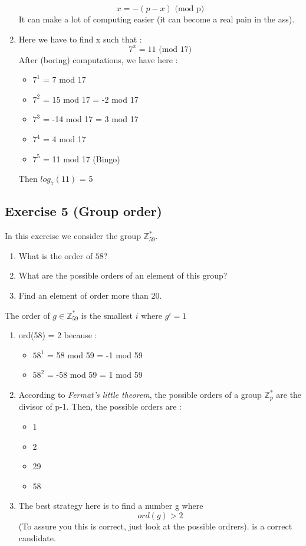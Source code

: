 \begin{solution}
\begin{enumerate}
    $$ x = -(p - x) \text{ (mod p)} $$  
    It can make a lot of computing easier (it can become a real pain in the ass).
    \item Here we have to find x such that : 
    $$ 7^x = 11 \text{ (mod 17)} $$
    After (boring) computations, we have here :
    \begin{itemize}
        \item $7^1$ = 7 mod 17
        \item $7^2$ = 15 mod 17 = -2 mod 17
        \item $7^3$ = -14 mod 17 = 3 mod 17
        \item $7^4$ = 4 mod 17
        \item $7^5$ = 11 mod 17 (Bingo)
    \end{itemize}
    Then $log_7(11)$ = 5
\end{enumerate}
\end{solution}

\subsection{Exercise 5 (Group order)}
In this exercise we consider the group $\mathbb{Z}_{59}^*$.

\begin{enumerate}
	\item What is the order of $58$?
	\item What are the possible orders of an element of this group?
	\item Find an element of order more than $20$.
	
\end{enumerate}
\begin{solution}
The order of $g \in \mathbb{Z}^*_{59}$ is the smallest $i$ where $g^i = 1$ 
\begin{enumerate}
    \item ord(58) = 2 because :
    \begin{itemize}
        \item  $58^1$ = 58 mod 59 = -1 mod 59
        \item  $58^2$ = -58 mod 59 = 1 mod 59
    \end{itemize}
    \item According to \textit{Fermat's little theorem}, the possible orders of a group $\mathbb{Z}^*_{p}$ are the divisor of p-1. Then, the possible orders are : 
    \begin{itemize}
        \item 1
        \item 2
        \item 29
        \item 58
    \end{itemize}
    \item The best strategy here is to find a number g where 
    $$ ord(g) > 2 $$
    (To assure you this is correct, just look at the possible ordrers).   is a correct candidate. 
\end{enumerate}
\end{solution}

